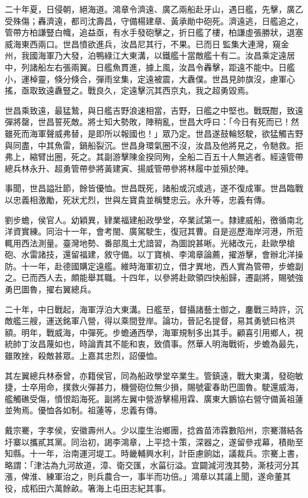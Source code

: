 \begin{pinyinscope}
二十年夏，日侵朝，絕海道。鴻章令濟遠、廣乙兩船赴牙山，遇日艦，先擊，廣乙受殊傷；轟濟遠，都司沈壽昌，守備楊建章、黃承勛中砲死。濟遠逃，日艦追之，管帶方柏謙豎白幟，追益亟，有水手發砲擊之，折日艦了樓，柏謙虛張勝狀，退塞威海東西兩口。世昌憤欲進兵，汝昌尼其行，不果。已而日監集大連灣，窺金州，我國海軍乃大發，泊鴨綠江大東溝，以鐵艦十當敵艦十有二。汝昌乘定遠居中，列諸船左右張兩翼。日艦魚貫進，據上風，汝昌令轟擊，距遠不能中。日艦小，運棹靈，倏分倏合，彈雨坌集，定遠被震，大纛僕。世昌見帥旗沒，慮軍心搖，亟取致遠纛豎之。戰良久，定遠擊沉其西京丸，我之超勇毀焉。

世昌乘致遠，最猛鷙，與日艦吉野浪速相當，吉野，日艦之中堅也。戰既酣，致遠彈將罄，世昌誓死敵。將士知大勢敗，陣稍亂，世昌大呼曰：「今日有死而已！然雖死而海軍聲威弗替，是即所以報國也！」眾乃定。世昌遂鼓輪怒駛，欲猛觸吉野與同盡，中其魚雷，鍋船裂沉。世昌身環氣圈不沒，汝昌及他將見之，令馳救。拒弗上，縮臂出圈，死之。其副游擊陳金揆同殉，全船二百五十人無逃者。經遠管帶總兵林永升、超勇管帶參將黃建寅、揚威管帶參將林履中並殞於陣。

事聞，世昌謚壯節，餘皆優恤。世昌既死，諸船或沉或逃，遂不復成軍。世昌臨戰以忠義相激勵，死狀尤烈，世與左寶貴並稱雙忠云。永升等，忠義有傳。

劉步蟾，侯官人。幼穎異，肄業福建船政學堂，卒業試第一。隸建威船，徼循南北洋資實練。同治十一年，會考閩、廣駕駛生，復冠其曹。自是巡歷海岸河港，所蒞輒用西法測量。臺灣地勢、番部風土尤諳習，為圖說甚晰。光緒改元，赴歐學槍砲、水雷諸技，還留福建，敘守備。以丁寶楨、李鴻章論薦，擢游擊，會辦北洋操防。十一年，赴德國購定遠艦。維時海軍初立，借才異地，西人實為管帶，步蟾副之。已而西人去，頗能舉其職。十四年，以參將赴歐領四快船歸，遷副將，賜號強勇巴圖魯，擢右翼總兵。

二十年，中日戰起，海軍浮泊大東溝。日艦至，督攝諸藝士御之，鏖戰三時許，沉敵艦三艘，運送銘軍八營，得以乘間登岸。論功，晉記名提督，易其勇號曰格洪額。明年，戰威海，中彈死。步蟾通西學，海軍規制多出其手。顧喜引用鄉人，視統帥丁汝昌蔑如也，時論責其不能和衷，致僨事。然華人明海戰術，步蟾為最先，雖敗挫，殺敵甚眾。上嘉其忠烈，詔優恤。

其左翼總兵林泰曾，亦籍侯官，同為船政學堂卒業生。管鎮遠，戰大東溝，發砲敏捷，士卒用命，撲救火彈甚力，機營砲位無少損，賜號霍春助巴圖魯。駛還威海，艦觸礁受傷，憤恨蹈海死。副將左翼中營游擊楊用霖、廣東大鵬協右營守備黃祖蓮並殉焉。優恤各如制。祖蓮等，忠義有傳。

戴宗騫，字孝侯，安徽壽州人。少以廩生治鄉團，捻酋苗沛霖數陷州，宗騫潛結各圩寨以攜貳其黨。同治初，謁李鴻章，上平捻十策，深器之，遂留參戎幕，積勛至知縣。十一年，治南運河堤工。時畿輔興水利，計臣慮餉詘，議裁兵。宗騫上書，略謂：「津沽為九河故道，漳、衛交匯，水菑衍溢。宜闢減河洩其勢，澌枝河分其漲，俾淮、練軍治之，則兵農合一，事半而功倍。」鴻章以其議上聞，遂命董其役，成稻田六萬餘畝。箸海上屯田志紀其事。


\end{pinyinscope}
